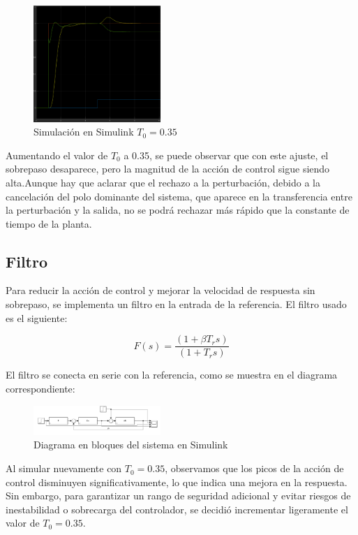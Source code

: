 \documentclass[letterpaper, 10 pt, conference]{ieeeconf}  %
\begin{document}
\begin{figure}[htpb]
  \centering
  \includegraphics[width=0.43\textwidth]{./IMAGENES/pid2.png}
  \caption{Simulación en Simulink \(T_{0} = 0.35\)}
  \label{fig:pid2}
\end{figure}

Aumentando el valor de $T_{0}$ a 0.35, se puede observar que con este ajuste, el sobrepaso desaparece, pero la magnitud de la acción de control sigue siendo alta.Aunque hay que aclarar que el rechazo a la perturbación, debido a la cancelación del polo dominante del sistema, que aparece en la transferencia entre la perturbación y la salida, no se podrá rechazar más rápido que la constante de tiempo de la planta.

\subsection{Filtro}

Para reducir la acción de control y mejorar la velocidad de respuesta sin sobrepaso, se implementa un filtro en la entrada de la referencia. El filtro usado es el siguiente:

\begin{equation*}
  F(s) = \frac{(1+\beta T_{r}s)}{(1+T_{r}s)}
\end{equation*}

El filtro se conecta en serie con la referencia, como se muestra en el diagrama correspondiente:

\begin{figure}[htpb]
  \centering
  \includegraphics[width=0.43\textwidth]{./IMAGENES/pid3.png}
  \caption{Diagrama en bloques del sistema en Simulink}
  \label{fig:pid3}
\end{figure}

Al simular nuevamente con $T_{0}=0.35$, observamos que los picos de la acción de control disminuyen significativamente, lo que indica una mejora en la respuesta. Sin embargo, para garantizar un rango de seguridad adicional y evitar riesgos de inestabilidad o sobrecarga del controlador, se decidió incrementar ligeramente el valor de $T_{0}=0.35$.
\end{document}
